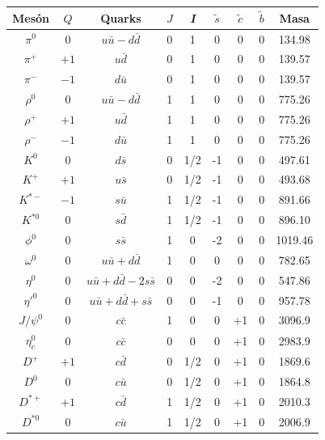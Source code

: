 \newpage
\begin{table}[h]
    \centering
    \begin{tabular}{|c|c|c|c|c|c|c|c|c|} \hline 
        Mesón & $Q$ & Quarks & $J$ &  \textit{I} & $\tilde{s}$ & $\tilde{c}$ & $\tilde{b}$ & Masa \\ 
        \hline 
        $\pi^{0}$ & $0$ & $u\bar{u} - d\bar{d}$ & 0 & 1 & 0 & 0 & 0 & 134.98 \\ 
        $\pi^{+}$ & $+1$ & $u\bar{d}$ & 0 & 1 & 0 & 0 & 0 & 139.57 \\ 
        $\pi^{-}$ & $-1$ & $d\bar{u}$ & 0 & 1 & 0 & 0 & 0 & 139.57 \\ 
        $\rho^{0}$ & $0$ & $u\bar{u} - d\bar{d}$ & 1 & 1 & 0 & 0 & 0 & 775.26 \\ 
        $\rho^{+}$ & $+1$ & $u\bar{d}$ & 1 & 1 & 0 & 0 & 0 & 775.26 \\ 
        $\rho^{-}$ & $-1$ & $d\bar{u}$ & 1 & 1 & 0 & 0 &0 & 775.26 \\ 
        \hline \hline 
        $K^{0}$ & $0$ & $d\bar{s}$ & 0 & 1/2 & -1 & 0 & 0 & 497.61 \\ 
        $K^{+}$ & $+1$ & $u\bar{s}$ & 0 & 1/2 & -1 & 0 & 0 & 493.68 \\ 
        $K^{*-}$ & $-1$ & $s\bar{u}$ & 1 & 1/2 & -1 & 0 & 0 & 891.66 \\ 
        $K^{*0}$ & $0$ & $s\bar{d}$ & 1 & 1/2 & -1 & 0 & 0 & 896.10 \\ 
        $\phi^{0}$ & $0$ & $s\bar{s}$ & 1 & 0 & -2 & 0 & 0 & 1019.46 \\ 
        $\omega^{0}$ & $0$ & $u\bar{u} + d\bar{d}$ & 1 & 0 & 0 & 0 & 0 & 782.65 \\ 
        $\eta^{0}$ & $0$ & $u\bar{u} + d\bar{d} - 2s\bar{s}$ & 0 & 0 & -2 & 0 & 0 & 547.86 \\ 
        $\eta'^{0}$ & $0$ & $u\bar{u} + d\bar{d} + s\bar{s}$ & 0 & 0 & -1 & 0 & 0 & 957.78 \\ 
        \hline \hline 
        $J/\psi^{0}$ & $0$ & $c\bar{c}$ & 1 & 0 & 0 & +1 & 0 & 3096.9 \\ 
        $\eta_{c}^{0}$ & $0$ & $c\bar{c}$ & 0 & 0 & 0 & +1 & 0 & 2983.9 \\ 
        $D^{+}$ & $+1$ & $c\bar{d}$ & 0 & 1/2 & 0 & +1 & 0 & 1869.6 \\ 
        $D^{0}$ & $0$ & $c\bar{u}$ & 0 & 1/2 & 0 & +1 & 0 & 1864.8 \\ 
        $D^{*+}$ & $+1$ & $c\bar{d}$ & 1 & 1/2 & 0 & +1 & 0 & 2010.3 \\ 
        $D^{*0}$ & $0$ & $c\bar{u}$ & 1 & 1/2 & 0 & +1 & 0 & 2006.9 \\ 

\end{tabular}
\end{table}
